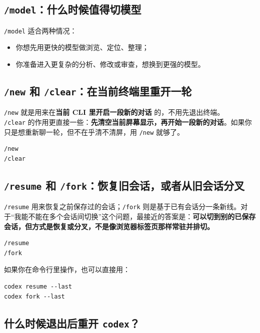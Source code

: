\documentclass[UTF8,a4paper,12pt]{ctexart}
\begin{document}
\subsection{\texttt{/model}：什么时候值得切模型}

\texttt{/model} 适合两种情况：
\begin{itemize}
  \item 你想先用更快的模型做浏览、定位、整理；
  \item 你准备进入更复杂的分析、修改或审查，想换到更强的模型。
\end{itemize}

\subsection{\texttt{/new} 和 \texttt{/clear}：在当前终端里重开一轮}

\texttt{/new} 就是用来在\textbf{当前 CLI 里开启一段新的对话} 的，不用先退出终端。\\
\texttt{/clear} 的作用更直接一些：\textbf{先清空当前屏幕显示，再开始一段新的对话}。如果你只是想重新聊一轮，但不在乎清不清屏，用 \texttt{/new} 就够了。

\begin{lstlisting}[style=cli]
/new
/clear
\end{lstlisting}

\subsection{\texttt{/resume} 和 \texttt{/fork}：恢复旧会话，或者从旧会话分叉}

\texttt{/resume} 用来恢复之前保存过的会话；\texttt{/fork} 则是基于已有会话分一条新线。对于“我能不能在多个会话间切换”这个问题，最接近的答案是：\textbf{可以切到别的已保存会话，但方式是恢复或分叉，不是像浏览器标签页那样常驻并排切。}

\begin{lstlisting}[style=cli]
/resume
/fork
\end{lstlisting}

如果你在命令行里操作，也可以直接用：

\begin{lstlisting}[style=cli]
codex resume --last
codex fork --last
\end{lstlisting}

\subsection{什么时候退出后重开 \texttt{codex}？}
\end{document}

